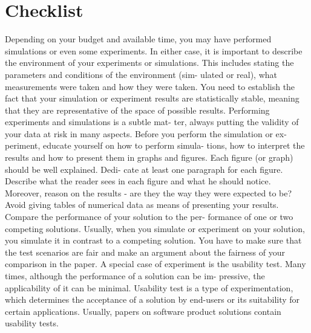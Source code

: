 \section{Checklist}
Depending on your budget and available time, you may
have performed simulations or even some experiments. In
either case, it is important to describe the environment
of your experiments or simulations. This includes stating
the parameters and conditions of the environment (sim-
ulated or real), what measurements were taken and how
they were taken.
You need to establish the fact that your simulation or
experiment results are statistically stable, meaning that
they are representative of the space of possible results.
Performing experiments and simulations is a subtle mat-
ter, always putting the validity of your data at risk in
many aspects. Before you perform the simulation or ex-
periment, educate yourself on how to perform simula-
tions, how to interpret the results and how to present
them in graphs and figures.
Each figure (or graph) should be well explained. Dedi-
cate at least one paragraph for each figure. Describe what
the reader sees in each figure and what he should notice.
Moreover, reason on the results - are they the way they
were expected to be? Avoid giving tables of numerical
data as means of presenting your results.
Compare the performance of your solution to the per-
formance of one or two competing solutions. Usually,
when you simulate or experiment on your solution, you
simulate it in contrast to a competing solution. You have
to make sure that the test scenarios are fair and make an
argument about the fairness of your comparison in the
paper.
A special case of experiment is the usability test. Many
times, although the performance of a solution can be im-
pressive, the applicability of it can be minimal. Usability
test is a type of experimentation, which determines the
acceptance of a solution by end-users or its suitability for
certain applications. Usually, papers on software product
solutions contain usability tests.
